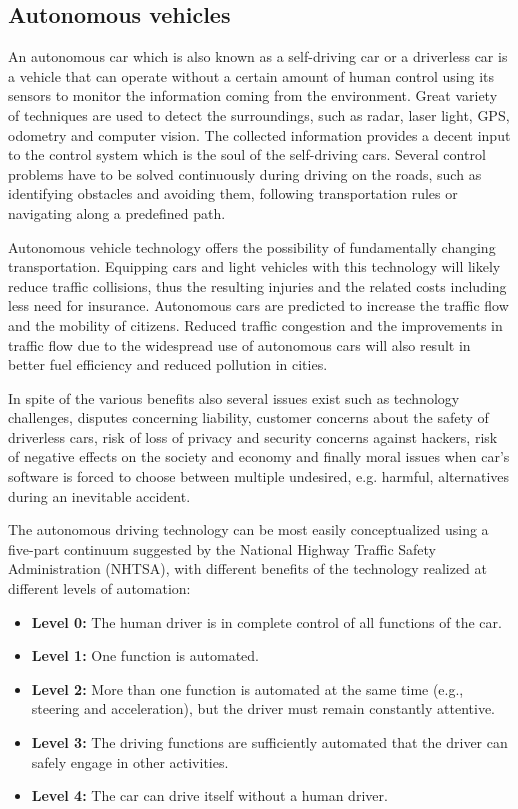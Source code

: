 \documentclass[12pt,english,twoside]{article}
\begin{document}
\subsection{Autonomous vehicles}
An autonomous car which is also known as a self-driving car or a driverless car is a vehicle that can operate without a certain amount of human control using its sensors to monitor the information coming from the environment. Great variety of techniques are used to detect the surroundings, such as radar, laser light, GPS, odometry and computer vision. The collected information provides a decent input to the control system which is the soul of the self-driving cars. Several control problems have to be solved continuously during driving on the roads, such as identifying obstacles and avoiding them, following transportation rules or navigating along a predefined path. 

Autonomous vehicle technology offers the possibility of fundamentally
changing transportation. Equipping cars and light vehicles
with this technology will likely reduce traffic collisions, thus the resulting injuries and the related costs including less need for insurance. Autonomous cars are predicted to increase the traffic flow and the mobility of citizens. Reduced traffic congestion and the improvements in traffic flow due to the widespread use of autonomous cars will also result in better fuel efficiency and reduced pollution in cities.

In spite of the various benefits also several issues exist such as technology challenges, disputes concerning liability, customer concerns about the safety of driverless cars, risk of loss of privacy and security concerns against hackers, risk of negative effects on the society and economy and finally moral issues when car's software is forced to choose between multiple undesired, e.g. harmful, alternatives during an inevitable accident. \cite{wiki}
 

The autonomous driving technology can be most easily conceptualized using a five-part
continuum suggested by the National Highway Traffic Safety Administration
(NHTSA), with different benefits of the technology realized
at different levels of automation: \cite{c}
\begin{itemize}
	\item \textbf{Level 0:}  The human driver is in complete control of all functions of the car.
	\item \textbf{Level 1:}  One function is automated.
	\item \textbf{Level 2:}  More than one function is automated at the same time (e.g., steering and acceleration), but the driver must remain constantly attentive.
	\item \textbf{Level 3:} The driving functions are sufficiently automated that the driver can safely engage in other activities.
	\item \textbf{Level 4:} The car can drive itself without a human driver.
\end{itemize}
\noindent
\end{document}
